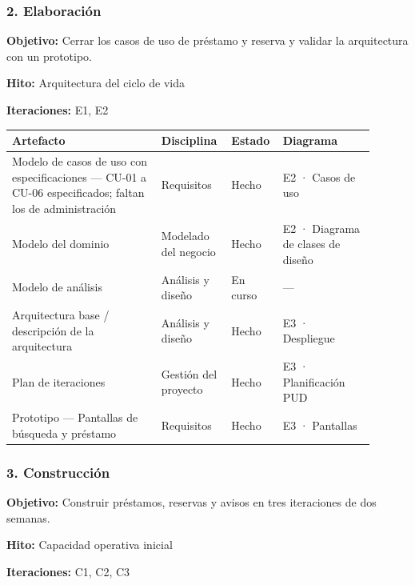 \subsubsection*{2. Elaboración}

\textbf{Objetivo:} Cerrar los casos de uso de préstamo y reserva y validar la arquitectura con un prototipo.

\textbf{Hito:} Arquitectura del ciclo de vida

\textbf{Iteraciones:} E1, E2

{\small
\begin{longtable}{@{}>{\raggedright\arraybackslash}p{0.396\linewidth}>{\raggedright\arraybackslash}p{0.167\linewidth}>{\raggedright\arraybackslash}p{0.091\linewidth}>{\raggedright\arraybackslash}p{0.244\linewidth}@{}}
\toprule
\textbf{Artefacto} & \textbf{Disciplina} & \textbf{Estado} & \textbf{Diagrama} \\
\midrule
\endhead
Modelo de casos de uso con especificaciones — CU-01 a CU-06 especificados; faltan los de administración & Requisitos & Hecho & E2 · Casos de uso \\
Modelo del dominio & Modelado del negocio & Hecho & E2 · Diagrama de clases de diseño \\
Modelo de análisis & Análisis y diseño & En curso & — \\
Arquitectura base / descripción de la arquitectura & Análisis y diseño & Hecho & E3 · Despliegue \\
Plan de iteraciones & Gestión del proyecto & Hecho & E3 · Planificación PUD \\
Prototipo — Pantallas de búsqueda y préstamo & Requisitos & Hecho & E3 · Pantallas \\
\bottomrule
\end{longtable}}

\subsubsection*{3. Construcción}

\textbf{Objetivo:} Construir préstamos, reservas y avisos en tres iteraciones de dos semanas.

\textbf{Hito:} Capacidad operativa inicial

\textbf{Iteraciones:} C1, C2, C3


